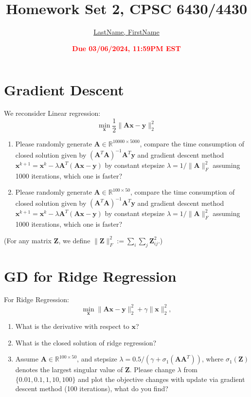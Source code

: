 \documentclass[11pt]{article}
\title{{\bf Homework Set 2, CPSC 6430/4430}}
\author{\Large\underline{LastName, FirstName}}
\date{\textbf{\Large\textcolor{red}{Due 03/06/2024, 11:59PM EST}}}
\newcommand{\R}{\mathbb{R}}
\newcommand{\minimize}{\operatorname*{minimize\ }}
\newcommand{\mtx}[1]{\mathbf{#1}}
\newcommand{\vct}[1]{\mathbf{#1}}
\def \mA {\mtx{A}}
\def \mI {\mtx{I}}
\def \mU {\mtx{U}}
\def \mX {\mtx{X}}
\def \mZ {\mtx{Z}}
\def \vv {\vct{v}}
\def \vx {\vct{x}}
\def \vy {\vct{y}}
\def \R {\mathbb{R}}
\begin{document}
\maketitle

\section*{Gradient Descent}
We reconsider Linear regression:
\begin{equation}
	\min\limits_{\vx}\frac{1}{2}\|\mA\vx-\vy\|^2_2
\end{equation}
\begin{enumerate}
	\item Please randomly generate $\mA\in\R^{10000\times 5000}$, compare the time consumption of closed solution given by $(\mA^T\mA)^{-1}\mA^T\vy$ and gradient descent method $\vx^{k+1}=\vx^k-\lambda\mA^T(\mA\vx-\vy)$ by constant stepsize $\lambda=1/\|\mA\|_F^2$ assuming 1000 iterations, which one is faster?
	\item Please randomly generate $\mA\in\R^{100\times 50}$, compare the time consumption of closed solution given by $(\mA^T\mA)^{-1}\mA^T\vy$ and gradient descent method $\vx^{k+1}=\vx^k-\lambda\mA^T(\mA\vx-\vy)$ by constant stepsize $\lambda=1/\|\mA\|_F^2$ assuming 1000 iterations, which one is faster?
\end{enumerate}
(For any matrix $\mZ$, we define $\|\mZ\|_F^2:=\sum\limits_i\sum\limits_j\mZ_{ij}^2$.)
\newpage
\section*{GD for Ridge Regression}
For Ridge Regression:
\begin{equation}
	\min\limits_{\vx}\|\mA\vx-\vy\|^2_2+\gamma\|\vx\|^2_2,
\end{equation}
\begin{enumerate}
	\item What is the derivative with respect to $\vx$?
	\item What is the closed solution of ridge regression?
	\item Assume $\mA\in\R^{100\times50}$, and stepsize $\lambda=0.5/(\gamma+\sigma_1(\mA\mA^T))$, where $\sigma_1(\mZ)$ denotes the largest singular value of $\mZ$. Please change $\lambda$ from $\{0.01, 0.1,1,10,100\}$ and plot the objective changes with update via gradient descent method (100 iterations), what do you find?
\end{enumerate}
\newpage
\end{document}

